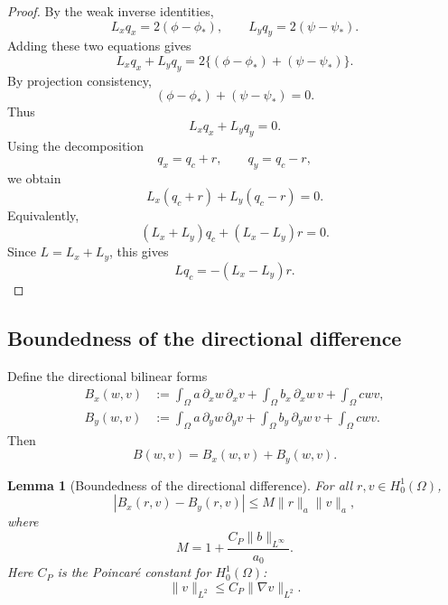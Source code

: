\documentclass[11pt]{article}
\newtheorem{lemma}{Lemma}
\begin{document}
\begin{proof}
By the weak inverse identities,
\[
    L_xq_x=2(\phi-\phi_*),
    \qquad
    L_yq_y=2(\psi-\psi_*).
\]
Adding these two equations gives
\[
    L_xq_x+L_yq_y
    =
    2\{(\phi-\phi_*)+(\psi-\psi_*)\}.
\]
By projection consistency,
\[
    (\phi-\phi_*)+(\psi-\psi_*)=0.
\]
Thus
\[
    L_xq_x+L_yq_y=0.
\]
Using the decomposition
\[
    q_x=q_c+r,
    \qquad
    q_y=q_c-r,
\]
we obtain
\[
    L_x(q_c+r)+L_y(q_c-r)=0.
\]
Equivalently,
\[
    (L_x+L_y)q_c+(L_x-L_y)r=0.
\]
Since \(L=L_x+L_y\), this gives
\[
    Lq_c=-(L_x-L_y)r.
\]
\end{proof}

\subsection{Boundedness of the directional difference}
\label{subsec:boundedness-directional-difference}

Define the directional bilinear forms
\begin{align}
    B_x(w,v)
    & :=
    \int_\Omega a\,\partial_x w\,\partial_x v
    +
    \int_\Omega b_x\,\partial_x w\,v
    +
    \int_\Omega cwv,
    \label{eq:Bx-definition}
    \\
    B_y(w,v)
    & :=
    \int_\Omega a\,\partial_y w\,\partial_y v
    +
    \int_\Omega b_y\,\partial_y w\,v
    +
    \int_\Omega cwv.
    \label{eq:By-definition}
\end{align}
Then
\[
    B(w,v)=B_x(w,v)+B_y(w,v).
\]

\begin{lemma}[Boundedness of the directional difference]
\label{lemma:boundedness-directional-difference}
For all \(r,v\in H_0^1(\Omega)\),
\begin{equation}
    |B_x(r,v)-B_y(r,v)|
    \le
    M\|r\|_a\|v\|_a,
    \label{eq:directional-difference-bound}
\end{equation}
where
\begin{equation}
    M
    =
    1+
    \frac{C_P\|b\|_{L^\infty}}{a_0}.
    \label{eq:M-constant}
\end{equation}
Here \(C_P\) is the Poincaré constant for \(H_0^1(\Omega)\):
\[
    \|v\|_{L^2}\le C_P\|\nabla v\|_{L^2}.
\]
\end{lemma}
\end{document}
